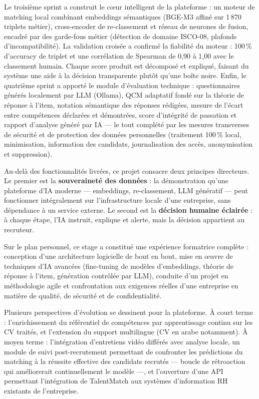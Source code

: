 \documentclass[12pt,a4paper]{report}
\begin{document}
\medskip

Le troisième sprint a construit le c\oe ur intelligent de la plateforme : un moteur de matching local combinant embeddings sémantiques (BGE-M3 affiné sur 1\,870 triplets métier), cross-encoder de re-classement et réseau de neurones de fusion, encadré par des garde-fous métier (détection de domaine ISCO-08, plafonds d'incompatibilité). La validation croisée a confirmé la fiabilité du moteur : 100\,\% d'accuracy de triplet et une corrélation de Spearman de 0,90 à 1,00 avec le classement humain. Chaque score produit est décomposé et expliqué, faisant du système une aide à la décision transparente plutôt qu'une boîte noire. Enfin, le quatrième sprint a apporté le module d'évaluation technique : questionnaires générés localement par LLM (Ollama), QCM adaptatif fondé sur la théorie de réponse à l'item, notation sémantique des réponses rédigées, mesure de l'écart entre compétences déclarées et démontrées, score d'intégrité de passation et rapport d'analyse généré par IA --- le tout complété par les mesures transverses de sécurité et de protection des données personnelles (traitement 100\,\% local, minimisation, information des candidats, journalisation des accès, anonymisation et suppression).

\medskip

Au-delà des fonctionnalités livrées, ce projet consacre deux principes directeurs. Le premier est la \textbf{souveraineté des données} : la démonstration qu'une plateforme d'IA moderne --- embeddings, re-classement, LLM génératif --- peut fonctionner intégralement sur l'infrastructure locale d'une entreprise, sans dépendance à un service externe. Le second est la \textbf{décision humaine éclairée} : à chaque étape, l'IA instruit, explique et alerte, mais la décision appartient au recruteur.

\medskip

Sur le plan personnel, ce stage a constitué une expérience formatrice complète : conception d'une architecture logicielle de bout en bout, mise en \oe uvre de techniques d'IA avancées (fine-tuning de modèles d'embeddings, théorie de réponse à l'item, génération contrôlée par LLM), conduite d'un projet en méthodologie agile et confrontation aux exigences réelles d'une entreprise en matière de qualité, de sécurité et de confidentialité.

\medskip

Plusieurs perspectives d'évolution se dessinent pour la plateforme. À court terme : l'enrichissement du référentiel de compétences par apprentissage continu sur les CV traités, et l'extension du support multilingue (CV en arabe notamment). À moyen terme : l'intégration d'entretiens vidéo différés avec analyse locale, un module de suivi post-recrutement permettant de confronter les prédictions du matching à la réussite effective des candidats recrutés --- boucle de rétroaction qui améliorerait continuellement le modèle ---, et l'ouverture d'une API permettant l'intégration de TalentMatch aux systèmes d'information RH existants de l'entreprise.
\end{document}
